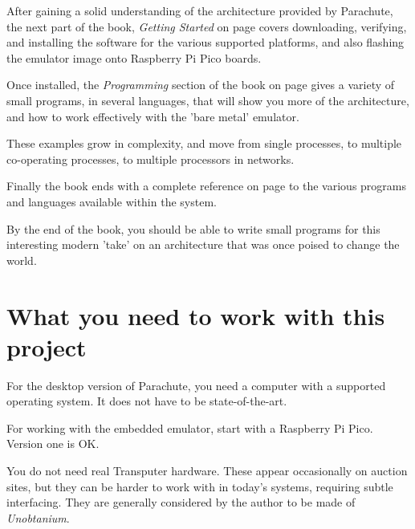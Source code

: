 \documentclass[a4paper]{tufte-book}
\begin{document}
\vspace{5mm}

After gaining a solid understanding of the architecture provided by Parachute, the next part of the book, \textit{Getting Started} on page \pageref{getting-started} covers downloading, verifying, and installing the software for the various supported platforms, and also flashing the emulator image onto Raspberry Pi Pico boards.

\vspace{5mm}

Once installed, the \textit{Programming} section of the book on page \pageref{tutorial-introduction} gives a variety of small programs, in several languages, that will show you more of the architecture, and how to work effectively with the 'bare metal' emulator.

These examples grow in complexity, and move from single processes, to multiple co-operating processes, to multiple processors in networks.

\vspace{5mm}

Finally the book ends with a complete reference on page \pageref{reference} to the various programs and languages available within the system.

\vspace{5mm}

By the end of the book, you should be able to write small programs for this interesting modern 'take' on an architecture that was once poised to change the world.


\section{What you need to work with this project}
For the desktop version of Parachute, you need a computer with a supported operating system. It does not have to be state-of-the-art.

For working with the embedded emulator, start with a Raspberry Pi Pico. Version one is OK.

\vspace{5mm}

You do not need real Transputer hardware. These appear occasionally on auction sites, but they can be harder to work with in today's systems, requiring subtle interfacing. They are generally considered by the author to be made of \textit{Unobtanium}.
\end{document}
